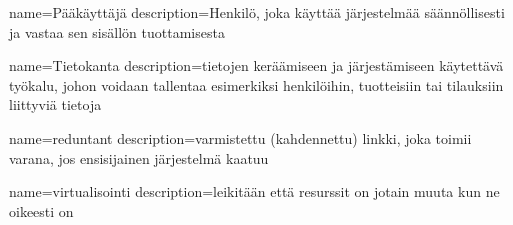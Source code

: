     {
    name={Pääkäyttäjä}
    description={Henkilö, joka käyttää järjestelmää säännöllisesti ja vastaa sen sisällön tuottamisesta}
    }

    {
    name={Tietokanta}
    description={tietojen keräämiseen ja järjestämiseen käytettävä työkalu, johon voidaan tallentaa esimerkiksi henkilöihin, tuotteisiin tai tilauksiin liittyviä tietoja}
    }

    {
    name={reduntant}
    description={varmistettu (kahdennettu) linkki, joka toimii varana, jos ensisijainen järjestelmä kaatuu}
    }

    {
    name={virtualisointi}
    description={leikitään että resurssit on jotain muuta kun ne oikeesti on}
    }


